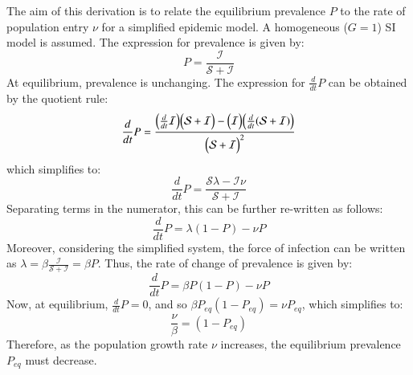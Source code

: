The aim of this derivation is to relate the equilibrium prevalence $P$
to the rate of population entry $\nu$
for a simplified epidemic model.
A homogeneous ($G = 1$) SI model is assumed.
The expression for prevalence is given by:
\begin{equation}
P = \frac{\mathcal{I}}{\mathcal{S}+\mathcal{I}}
\end{equation}
At equilibrium, prevalence is unchanging.
The expression for $\frac{d}{dt}P$ can be obtained by the quotient rule:
\begin{equation}
\frac{d}{dt}P = \frac{\Big( \frac{d}{dt}\mathcal{I} \Big) \Big( \mathcal{S}+\mathcal{I} \Big)
  - \Big( \mathcal{I} \Big) \Big( \frac{d}{dt} (\mathcal{S}+\mathcal{I}) \Big) }
{{\Big(\mathcal{S}+\mathcal{I}\Big)}^{2}}\\
\end{equation}
which simplifies to:
\begin{equation}
\frac{d}{dt}P = \frac{ \mathcal{S} \lambda - \mathcal{I} \nu } {\mathcal{S} + \mathcal{I}}
\end{equation}
Separating terms in the numerator, this can be further re-written as follows:
\begin{equation}
\frac{d}{dt}P = \lambda (1 - P) - \nu P
\end{equation}
Moreover, considering the simplified system,
the force of infection can be written as
$\lambda = \beta \frac{\mathcal{I}}{\mathcal{S}+\mathcal{I}} = \beta P$.
Thus, the rate of change of prevalence is given by:
\begin{equation}
\frac{d}{dt}P = \beta P (1 - P) - \nu P
\end{equation}
Now, at equilibrium, $\frac{d}{dt}P = 0$, and so $\beta P_{eq} (1 - P_{eq}) = \nu P_{eq}$,
which simplifies to:
\begin{equation}
\frac{\nu}{\beta} = (1 - P_{eq})
\end{equation}
Therefore, as the population growth rate $\nu$ increases,
the equilibrium prevalence $P_{eq}$ must decrease.
